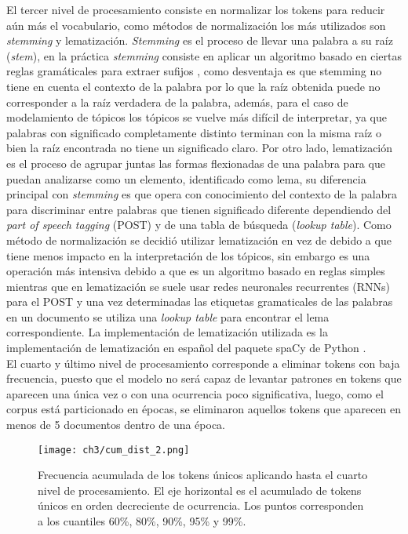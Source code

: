 \documentclass[letterpaper,12pt,oneside]{book} %
\begin{document}
El tercer nivel de procesamiento consiste en normalizar los tokens para reducir aún más el vocabulario, como métodos de normalización los más utilizados son \textit{stemming}  y lematización. \textit{Stemming} es el proceso de llevar una palabra a su raíz (\textit{stem}), en la práctica \textit{stemming} consiste en aplicar un algoritmo basado en ciertas reglas gramáticales para extraer sufijos \citep{porter1980algorithm}, como desventaja es que stemming no tiene en cuenta el contexto de la palabra por lo que la raíz obtenida puede no corresponder a la raíz verdadera de la palabra, además, para el caso de modelamiento de tópicos los tópicos se vuelve más difícil de interpretar, ya que palabras con significado completamente distinto terminan con la misma raíz o bien la raíz encontrada no tiene un significado claro. Por otro lado, lematización es el proceso de agrupar juntas las formas flexionadas de una palabra para que puedan analizarse como un elemento, identificado como lema, su diferencia principal con \textit{stemming} es que opera con conocimiento del contexto de la palabra para discriminar entre palabras que tienen significado diferente dependiendo del \textit{part of speech tagging} (POST) y de una tabla de búsqueda (\textit{lookup table}). Como método de normalización se decidió utilizar lematización en vez de  debido a que tiene menos impacto en la interpretación de los tópicos, sin embargo es una operación más intensiva debido a que  es un algoritmo basado en reglas simples mientras que en lematización se suele usar redes neuronales recurrentes (RNNs) para el POST y una vez determinadas las etiquetas gramaticales de las palabras en un documento se utiliza una \textit{lookup table} para encontrar el lema correspondiente. La implementación de lematización utilizada es la implementación de lematización en español del paquete spaCy de Python \citep{spacy2}.\\

El cuarto y último nivel de procesamiento corresponde a eliminar tokens con baja frecuencia, puesto que el modelo no será capaz de levantar patrones en tokens que aparecen una única vez o con una ocurrencia poco significativa, luego, como el corpus está particionado en épocas, se eliminaron aquellos tokens que aparecen en menos de 5 documentos dentro de una época.

\begin{figure}
    \centering
    \texttt{[image: ch3/cum\_dist\_2.png]}
    \caption{Frecuencia acumulada de los tokens únicos aplicando hasta el cuarto nivel de procesamiento. El eje horizontal es el acumulado de tokens únicos en orden decreciente de ocurrencia. Los puntos corresponden a los cuantiles 60\%, 80\%, 90\%, 95\% y 99\%.}
    \label{img:cum_dist2}
\end{figure}
\end{document}
